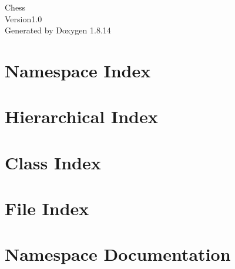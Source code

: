 \documentclass[twoside]{book}
\newcommand{\+}{\discretionary{\mbox{\scriptsize$\hookleftarrow$}}{}{}}
\newcommand{\clearemptydoublepage}{%
  \newpage{\pagestyle{empty}\cleardoublepage}%
}
\begin{document}
\hypersetup{pageanchor=false,
             bookmarksnumbered=true,
             pdfencoding=unicode
            }
\begin{titlepage}
\vspace*{7cm}
\begin{center}%
{\Large Chess \\[1ex]\large Version1.\+0 }\\
\vspace*{1cm}
{\large Generated by Doxygen 1.8.14}\\
\end{center}
\end{titlepage}
\clearemptydoublepage
{}
\tableofcontents
\clearemptydoublepage
{}
\hypersetup{pageanchor=true}

\chapter{Namespace Index}

\chapter{Hierarchical Index}

\chapter{Class Index}

\chapter{File Index}

\chapter{Namespace Documentation}





\end{document}
